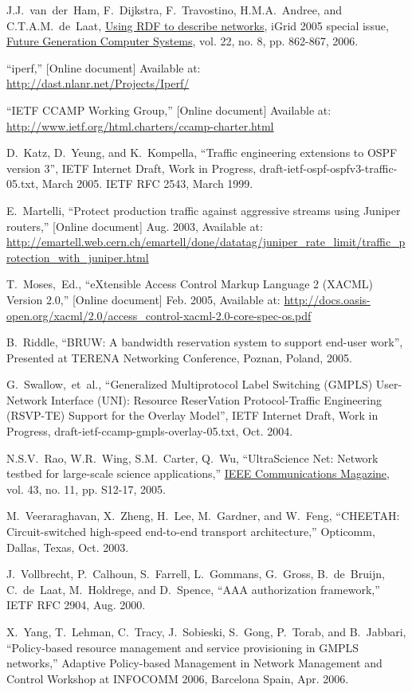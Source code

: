 \documentclass[conference]{IEEEtran}
\begin{document}
\begin{thebibliography}{1}
J.J.~van~der~Ham, F.~Dijkstra, F.~Travostino, H.M.A.~Andree, and C.T.A.M.~de~Laat,
\underline{Using RDF to describe networks},
iGrid 2005 special issue,
\underline{Future Generation Computer Systems},
vol. 22, no. 8, pp. 862-867, 2006.

``iperf,'' [Online document] Available at: \\
\url{http://dast.nlanr.net/Projects/Iperf/}

``IETF CCAMP Working Group,'' [Online document] Available at:
\url{http://www.ietf.org/html.charters/ccamp-charter.html}

D.~Katz, D.~Yeung, and K.~Kompella,
``Traffic engineering extensions to OSPF version 3'',
IETF Internet Draft, Work in Progress,
draft-ietf-ospf-ospfv3-traffic-05.txt, March 2005.
IETF RFC 2543, March 1999.

E.~Martelli,
``Protect production traffic against aggressive streams using Juniper routers,''
[Online document] Aug. 2003, Available at:
\url{http://emartell.web.cern.ch/emartell/done/datatag/juniper_rate_limit/traffic_protection_with_juniper.html}

T.~Moses,~Ed.,
``eXtensible Access Control Markup Language 2 (XACML) Version 2.0,''
[Online document] Feb. 2005, Available at:
\url{http://docs.oasis-open.org/xacml/2.0/access_control-xacml-2.0-core-spec-os.pdf}

B.~Riddle,
``BRUW: A bandwidth reservation system to support end-user work'',
Presented at TERENA Networking Conference, Poznan, Poland, 2005.

G.~Swallow,~et~al.,
``Generalized Multiprotocol Label Switching (GMPLS) User-Network Interface
(UNI): Resource ReserVation Protocol-Traffic Engineering (RSVP-TE) Support
for the Overlay Model'', IETF Internet Draft, Work in Progress,
draft-ietf-ccamp-gmpls-overlay-05.txt, Oct. 2004.

N.S.V.~Rao, W.R.~Wing, S.M.~Carter, Q.~Wu,
``UltraScience Net: Network testbed for large-scale science applications,''
\underline{IEEE Communications Magazine}, vol. 43, no. 11, pp. S12-17, 2005.

M.~Veeraraghavan, X.~Zheng, H.~Lee, M.~Gardner, and W.~Feng,
``CHEETAH: Circuit-switched high-speed end-to-end transport architecture,''
Opticomm, Dallas, Texas, Oct. 2003.

J.~Vollbrecht, P.~Calhoun, S.~Farrell, L.~Gommans, G.~Gross, B.~de~Bruijn,
C.~de~Laat, M.~Holdrege, and D.~Spence,
``AAA authorization framework,'' IETF RFC 2904, Aug. 2000.

X.~Yang, T.~Lehman, C.~Tracy, J.~Sobieski, S.~Gong, P.~Torab, and B.~Jabbari,
``Policy-based resource management and service provisioning in GMPLS networks,''
Adaptive Policy-based Management in Network Management and Control Workshop
at INFOCOMM 2006, Barcelona Spain, Apr. 2006.

\end{thebibliography}
\end{document}
